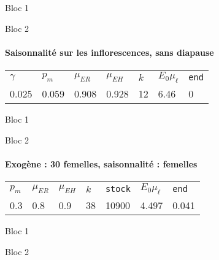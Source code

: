 \documentclass[a4paper, 11pt]{article}
\begin{document}
 Bloc 1
  \begin{figure}[ht]
 \centering
{}
\end{figure}

Bloc 2
  \begin{figure}[ht]
 \centering
{}
\end{figure}
 

 \clearpage
  \paragraph{Saisonnalité sur les inflorescences, sans diapause}
   \begin{center}
\begin{tabular}{lllllll}
$\gamma$ & $p_m$ & $\mu_{ER}$ & $\mu_{EH}$ & $k$ & $E_0 \mu_{\ell}$ & \texttt{end}\\
0.025 & 0.059 & 0.908 & 0.928 & 12 & 6.46 & 0
\end{tabular}
 \end{center}
 
 Bloc 1
  \begin{figure}[ht]
 \centering
{}
\end{figure}
 
 Bloc 2
  \begin{figure}[ht]
 \centering
{}
\end{figure}
 
  
 \clearpage
  \paragraph{Exogène : 30 femelles, saisonnalité : femelles}
   \begin{center}
\begin{tabular}{lllllll}
 $p_m$ & $\mu_{ER}$ & $\mu_{EH}$ & $k$ & \texttt{stock} & $E_0 \mu_{\ell}$ & \texttt{end}\\
 0.3 & 0.8 & 0.9 & 38 & 10900 & 4.497 & 0.041
\end{tabular}
 \end{center}
 
 Bloc 1
  \begin{figure}[ht]
 \centering
{}
\end{figure}

Bloc 2
  \begin{figure}[ht]
 \centering
{}
\end{figure}

 
\end{document}
